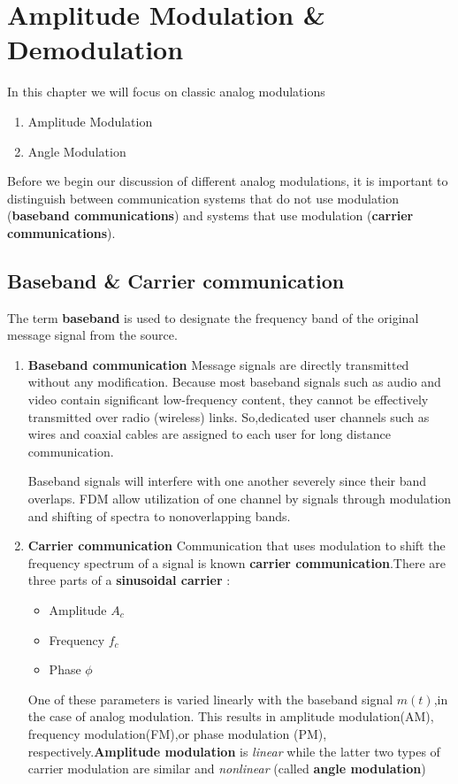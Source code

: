 \section{Amplitude Modulation \& Demodulation}
In this chapter we will focus on classic analog modulations
\begin{enumerate}
  \item Amplitude Modulation
  \item Angle Modulation
\end{enumerate}
Before we begin our discussion of different analog modulations, it is important to distinguish between communication systems that do not use modulation (\textbf{baseband communications}) and systems that use modulation (\textbf{carrier communications}).

\subsection{Baseband \& Carrier communication}
The term \textbf{baseband} is used to designate the frequency band of the original message signal from the source.
\begin{enumerate}
  \item \textbf{Baseband communication}
  \newline
  Message signals are directly transmitted without any modification. Because most baseband signals such as audio and video contain significant low-frequency content, they cannot be effectively transmitted over radio (wireless) links. So,dedicated user channels such as wires and coaxial cables are assigned to each user for long distance communication.
  \par Baseband signals will interfere with one another severely since their band overlaps. FDM allow utilization of one channel by signals through modulation and shifting of spectra to nonoverlapping bands.

  \item \textbf{Carrier communication}
  \newline
  Communication that uses modulation to shift the frequency spectrum of a signal is known \textbf{carrier communication}.There are three parts of a \textbf{sinusoidal carrier} :
  \begin{itemize}
    \item Amplitude $A_c$
    \item Frequency $f_c$
    \item Phase $\phi$
  \end{itemize}
  One of these parameters is varied linearly with the baseband signal $m(t)$,in the case of analog modulation. This results in amplitude modulation(AM), frequency modulation(FM),or phase modulation (PM), respectively.\textbf{Amplitude modulation} is \textit{linear} while the latter two types of carrier modulation are similar and \textit{nonlinear} (called \textbf{angle modulation})
\end{enumerate}


